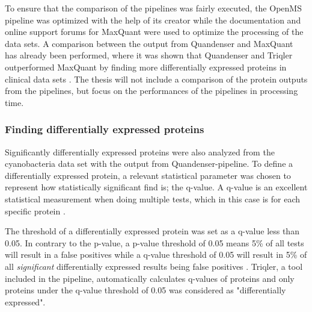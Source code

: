 To ensure that the comparison of the pipelines was fairly executed, the OpenMS pipeline was optimized with the help of its creator while the documentation and online support forums for MaxQuant were used to optimize the processing of the data sets. A comparison between the output from Quandenser and MaxQuant has already been performed, where it was shown that Quandenser and Triqler outperformed MaxQuant by finding more differentially expressed proteins in clinical data sets \cite{quandenser}. The thesis will not include a comparison of the protein outputs from the pipelines, but focus on the performances of the pipelines in processing time.

\subsubsection{Finding differentially expressed proteins}
Significantly differentially expressed proteins were also analyzed from the cyanobacteria data set with the output from Quandenser-pipeline. To define a differentially expressed protein, a relevant statistical parameter was chosen to represent how statistically significant find is; the q-value. A q-value is an excellent statistical measurement when doing multiple tests, which in this case is for each specific protein \cite{q-value}.

The threshold of a differentially expressed protein was set as a q-value less than 0.05. In contrary to the p-value, a p-value threshold of 0.05 means 5\% of all tests will result in a false positives while a q-value threshold of 0.05 will result in 5\% of all \textit{significant} differentially expressed results being false positives \cite{q-value} \cite{nonlinear}. Triqler, a tool included in the pipeline, automatically calculates q-values of proteins and only proteins under the q-value threshold of 0.05 was considered as "differentially expressed".
